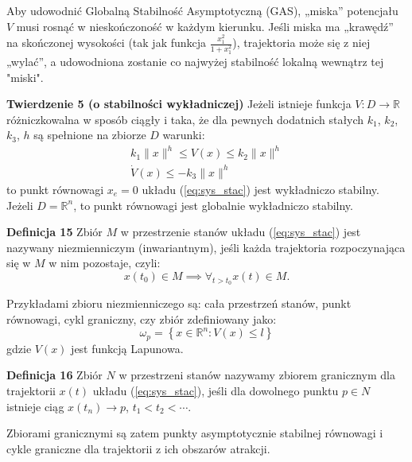 \documentclass{article}
\begin{document}
\begin{tcolorbox}[colback=blue!5, colframe=blue!75!black, title=Ważne]
Aby udowodnić Globalną Stabilność Asymptotyczną (GAS), „miska” potencjału $V$
musi rosnąć w nieskończoność w każdym kierunku. Jeśli miska ma „krawędź” na
skończonej wysokości (tak jak funkcja $\frac{x_1^2}{1 + x_1^2}$), trajektoria
może się z niej „wylać”, a udowodniona zostanie co najwyżej stabilność lokalną
wewnątrz tej "miski".
\end{tcolorbox}

\textbf{Twierdzenie 5 (o stabilności wykładniczej)}
Jeżeli istnieje funkcja $V:D\rightarrow\mathbb{R}$ różniczkowalna w sposób ciągły i taka, że dla pewnych dodatnich stałych $k_{1}$, $k_{2}$, $k_{3}$, $h$ są spełnione na zbiorze $D$ warunki:
\begin{equation}\label{eq:stab_wyk}
    \begin{array}{c}
         k_{1}\lVert x \rVert^{h} \leq V(x) \leq k_{2}\lVert x \rVert^{h}\\
         \dot{V}(x) \leq -k_{3}\lVert x \rVert^{h}
    \end{array}
\end{equation}
to punkt równowagi $x_{e} = 0$ układu (\ref{eq:sys_stac}) jest wykładniczo stabilny. Jeżeli $D = \mathbb{R}^{n}$, to punkt równowagi jest globalnie wykładniczo stabilny.

\textbf{Definicja 15}
Zbiór $M$ w przestrzenie stanów układu (\ref{eq:sys_stac}) jest nazywany niezmienniczym (inwariantnym), jeśli każda trajektoria rozpoczynająca się w $M$ w nim pozostaje, czyli:
\begin{equation}\label{eq:zbior_inwariantny}
    x(t_{0}) \in M \implies \forall_{t > t_{0}}x(t) \in M.
\end{equation}

Przykładami zbioru niezmienniczego są: cała przestrzeń stanów, punkt równowagi, cykl graniczny, czy zbiór zdefiniowany jako:
$$
    \omega_{p} = \left\{ x \in \mathbb{R}^{n}:V(x) \leq l \right\}
$$
gdzie $V(x)$ jest funkcją Lapunowa.

\textbf{Definicja 16}
Zbiór $N$ w przestrzeni stanów nazywamy zbiorem granicznym dla trajektorii $x(t)$ układu (\ref{eq:sys_stac}), jeśli dla dowolnego punktu $p \in N$ istnieje ciąg $x(t_{n}) \rightarrow p$, $t_{1} < t_{2} < \cdots$.

Zbiorami granicznymi są zatem punkty asymptotycznie stabilnej równowagi i cykle graniczne dla trajektorii z ich obszarów atrakcji.
\end{document}

